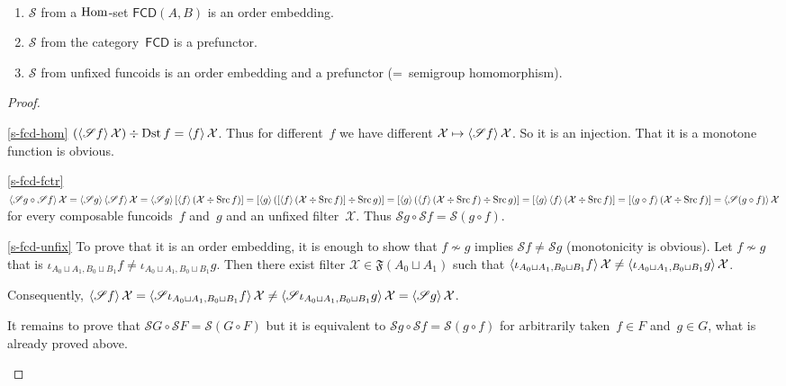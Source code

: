 \begin{prop}\label{s-fcd}
~
\begin{enumerate}
\item\label{s-fcd-hom} $\mathscr{S}$ from a $\operatorname{Hom}$-set $\mathsf{FCD}(A,B)$
is an order embedding.
\item\label{s-fcd-fctr} $\mathscr{S}$ from the category~$\mathsf{FCD}$
is a prefunctor.
\item\label{s-fcd-unfix} $\mathscr{S}$ from unfixed funcoids is an order embedding and a prefunctor (=~semigroup homomorphism).
\end{enumerate}
\end{prop}

\begin{proof}
~
\begin{widedisorder}
\item[\ref{s-fcd-hom}]
$(\left\langle \mathscr{S}f\right\rangle\mathcal{X})\div\operatorname{Dst} f=
\left\langle f\right\rangle\mathcal{X}$.
Thus for different~$f$ we have different
$\mathcal{X}\mapsto\left\langle \mathscr{S}f\right\rangle\mathcal{X}$.
So it is an injection. That it is a monotone function
is obvious.

\item[\ref{s-fcd-fctr}]
$\left\langle \mathscr{S}g\circ\mathscr{S}f\right\rangle\mathcal{X}=
\left\langle \mathscr{S}g\right\rangle\left\langle \mathscr{S}f\right\rangle\mathcal{X}=
\left\langle \mathscr{S}g\right\rangle[\left\langle f\right\rangle(\mathcal{X}\div\operatorname{Src} f)]=
[\left\langle g\right\rangle([\left\langle f\right\rangle(\mathcal{X}\div\operatorname{Src} f)]\div\operatorname{Src} g)]=
[\left\langle g\right\rangle(\left\langle f\right\rangle(\mathcal{X}\div\operatorname{Src} f)\div\operatorname{Src} g)]=
[\left\langle g\right\rangle\left\langle f\right\rangle(\mathcal{X}\div\operatorname{Src} f)]=
[\left\langle g\circ f\right\rangle(\mathcal{X}\div\operatorname{Src} f)]=
\left\langle \mathscr{S}(g\circ f)\right\rangle\mathcal{X}$ for every
composable funcoids~$f$ and~$g$ and an unfixed
filter~$\mathcal{X}$. Thus
$\mathscr{S}g\circ\mathscr{S}f=\mathscr{S}(g\circ f)$.

\item[\ref{s-fcd-unfix}]
To prove that it is an order embedding, it is enough to show that $f\nsim g$ implies
$\mathscr{S}f\ne\mathscr{S}g$
(monotonicity is obvious).
Let $f\nsim g$ that is
$\iota_{A_0\sqcup A_1,B_0\sqcup B_1}f\ne
\iota_{A_0\sqcup A_1,B_0\sqcup B_1}g$.
Then there exist filter
$\mathcal{X}\in\mathfrak{F}(A_0\sqcup A_1)$ such that
$\left\langle \iota_{A_0\sqcup A_1,B_0\sqcup B_1}f\right\rangle\mathcal{X}\ne
\left\langle \iota_{A_0\sqcup A_1,B_0\sqcup B_1}g\right\rangle\mathcal{X}$.

Consequently, $\left\langle \mathscr{S}f\right\rangle\mathcal{X}=
\left\langle \mathscr{S}\iota_{A_0\sqcup A_1,B_0\sqcup B_1}f\right\rangle\mathcal{X}\ne
\left\langle \mathscr{S}\iota_{A_0\sqcup A_1,B_0\sqcup B_1}g\right\rangle\mathcal{X}=
\left\langle \mathscr{S}g\right\rangle\mathcal{X}$.

It remains to prove that
$\mathscr{S}G\circ\mathscr{S}F=\mathscr{S}(G\circ F)$
but it is equivalent to 
$\mathscr{S}g\circ\mathscr{S}f=\mathscr{S}(g\circ f)$
for arbitrarily taken~$f\in F$ and~$g\in G$, what
is already proved above.
\end{widedisorder}
\end{proof}

